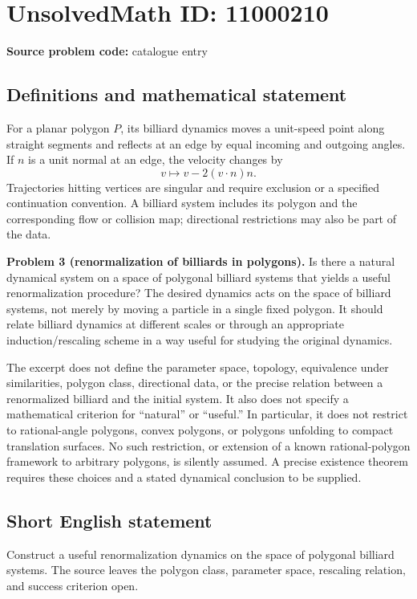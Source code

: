 \documentclass[11pt]{article}
\begin{document}
\section*{UnsolvedMath ID: 11000210}
\textbf{Source problem code:} catalogue entry
\subsection{Definitions and mathematical statement}
For a planar polygon $P$, its billiard dynamics moves a unit-speed point along straight segments and reflects at an edge by equal incoming and outgoing angles. If $n$ is a unit normal at an edge, the velocity changes by
\[
 v\longmapsto v-2(v\cdot n)n.
\]
Trajectories hitting vertices are singular and require exclusion or a specified continuation convention. A billiard system includes its polygon and the corresponding flow or collision map; directional restrictions may also be part of the data.

\textbf{Problem 3 (renormalization of billiards in polygons).} Is there a natural dynamical system on a space of polygonal billiard systems that yields a useful renormalization procedure? The desired dynamics acts on the space of billiard systems, not merely by moving a particle in a single fixed polygon. It should relate billiard dynamics at different scales or through an appropriate induction/rescaling scheme in a way useful for studying the original dynamics.

The excerpt does not define the parameter space, topology, equivalence under similarities, polygon class, directional data, or the precise relation between a renormalized billiard and the initial system. It also does not specify a mathematical criterion for ``natural'' or ``useful.'' In particular, it does not restrict to rational-angle polygons, convex polygons, or polygons unfolding to compact translation surfaces. No such restriction, or extension of a known rational-polygon framework to arbitrary polygons, is silently assumed. A precise existence theorem requires these choices and a stated dynamical conclusion to be supplied.
\subsection{Short English statement}
Construct a useful renormalization dynamics on the space of polygonal billiard systems. The source leaves the polygon class, parameter space, rescaling relation, and success criterion open.
\end{document}
